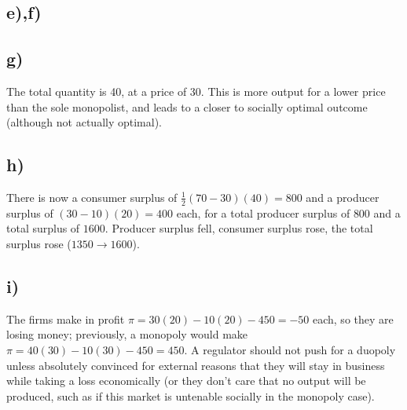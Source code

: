 \documentclass[12pt,letterpaper]{article}
\theoremstyle{definition}
\begin{document}
\subsection*{e),f)}

\begin{center}
\end{center}


\subsection*{g)}

The total quantity is 40, at a price of 30. This is more output for a lower
price than the sole monopolist, and leads to a closer to socially optimal
outcome (although not actually optimal).

\subsection*{h)}

There is now a consumer surplus of $\frac{1}{2}(70-30)(40) = 800$ and a producer
surplus of $(30 - 10)(20) = 400$ each, for a total producer surplus of $800$ and
a total surplus of $1600$. Producer surplus fell, consumer surplus rose, the
total surplus rose ($1350 \rightarrow 1600$).

\subsection*{i)}

The firms make in profit $\pi = 30(20) - 10(20) - 450 = -50$ each, so they are
losing money; previously, a monopoly would make $\pi = 40(30) - 10(30) -450 =
450$. A regulator should not push for a duopoly unless absolutely convinced for
external reasons that they will stay in business while taking a loss
economically (or they don't care that no output will be produced, such as if
this market is untenable socially in the monopoly case).
\end{document}
